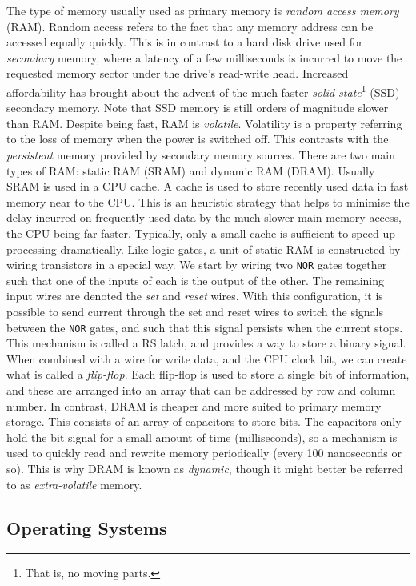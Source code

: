 \documentclass[11pt]{amsart}
\begin{document}
The type of memory usually used as primary memory is \emph{random access memory} (RAM). Random access refers to the fact that any memory address can be accessed equally quickly. This is in contrast to a hard disk drive used for \emph{secondary} memory, where a latency of a few milliseconds is incurred to move the requested memory sector under the drive's read-write head. Increased affordability has brought about the advent of the much faster \emph{solid state}\footnote{That is, no moving parts.} (SSD) secondary memory. Note that SSD memory is still orders of magnitude slower than RAM. Despite being fast, RAM is \emph{volatile}. Volatility is a property referring to the loss of memory when the power is switched off. This contrasts with the \emph{persistent} memory provided by secondary memory sources. There are two main types of RAM: static RAM (SRAM) and dynamic RAM (DRAM). Usually SRAM is used in a CPU cache. A cache is used to store recently used data in fast memory near to the CPU. This is an heuristic strategy that helps to minimise the delay incurred on frequently used data by the much slower main memory access, the CPU being far faster. Typically, only a small cache is sufficient to speed up processing dramatically. Like logic gates, a unit of static RAM is constructed by wiring transistors in a special way. We start by wiring two \texttt{NOR} gates together such that one of the inputs of each is the output of the other. The remaining input wires are denoted the \emph{set} and \emph{reset} wires. With this configuration, it is possible to send current through the set and reset wires to switch the signals between the \texttt{NOR} gates, and such that this signal persists when the current stops. This mechanism is called a RS latch, and provides a way to store a binary signal. When combined with a wire for write data, and the CPU clock bit, we can create what is called a \emph{flip-flop}. Each flip-flop is used to store a single bit of information, and these are arranged into an array that can be addressed by row and column number. In contrast, DRAM is cheaper and more suited to primary memory storage. This consists of an array of capacitors to store bits. The capacitors only hold the bit signal for a small amount of time (milliseconds), so a mechanism is used to quickly read and rewrite memory periodically (every 100 nanoseconds or so). This is why DRAM is known as \emph{dynamic}, though it might better be referred to as \emph{extra-volatile} memory.

\subsection{Operating Systems}
\end{document}
